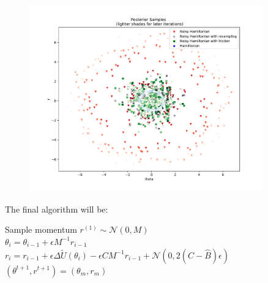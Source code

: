 \begin{figure}[H]
	\centering
	\includegraphics[width=0.9\textwidth]{posterior_samples.pdf}
\end{figure}


The final algorithm will be:

\begin{algorithm}[H]
	 {
		Sample momentum $r^{(1)}\sim\mathcal{N}(0, M)$\\
		 {
			$\theta_i=\theta_{i-1}+\epsilon M^{-1}r_{i-1}$\\
			$r_i = r_{i-1} + \epsilon \Delta\tilde{U}(\theta_i)-\epsilon C M^{-1}r_{i-1}+\mathcal{N}(0, 2(C-\hat{B})\epsilon)$\\
		}
		$(\theta^{t+1}, r^{t+1})=(\theta_m, r_m)$\\
	}
\end{algorithm}


